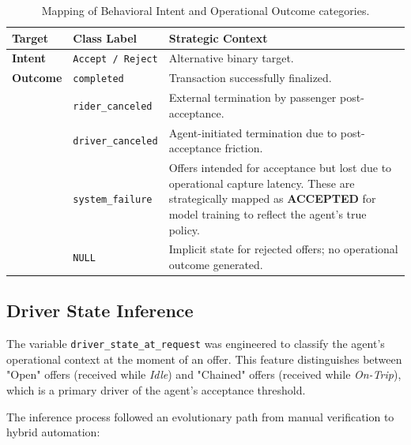\begin{table}[H]
    \centering
    \small
    \begin{tabularx}{\textwidth}{l l X} 
        \toprule
        \textbf{Target} & \textbf{Class Label} & \textbf{Strategic Context} \\
        \midrule
        \textbf{Intent} & \texttt{Accept / Reject} & Alternative binary target.\\
        \midrule
        \textbf{Outcome} & \texttt{completed} & Transaction successfully finalized. \\
        & \texttt{rider\_canceled} & External termination by passenger post-acceptance. \\
        & \texttt{driver\_canceled} & Agent-initiated termination due to post-acceptance friction. \\
        & \texttt{system\_failure} & Offers intended for acceptance but lost due to operational capture latency. These are strategically mapped as \textbf{ACCEPTED} for model training to reflect the agent's true policy. \\
        & \texttt{NULL} & Implicit state for rejected offers; no operational outcome generated. \\
        \bottomrule
    \end{tabularx}
    \caption{Mapping of Behavioral Intent and Operational Outcome categories.}
    \label{tab:outcomes}
\end{table}









\subsection{Driver State Inference}
The variable \texttt{driver\_state\_at\_request} was engineered to classify the agent's operational context at the moment of an offer. This feature distinguishes between "Open" offers (received while \textit{Idle}) and "Chained" offers (received while \textit{On-Trip}), which is a primary driver of the agent's acceptance threshold.

The inference process followed an evolutionary path from manual verification to hybrid automation:


